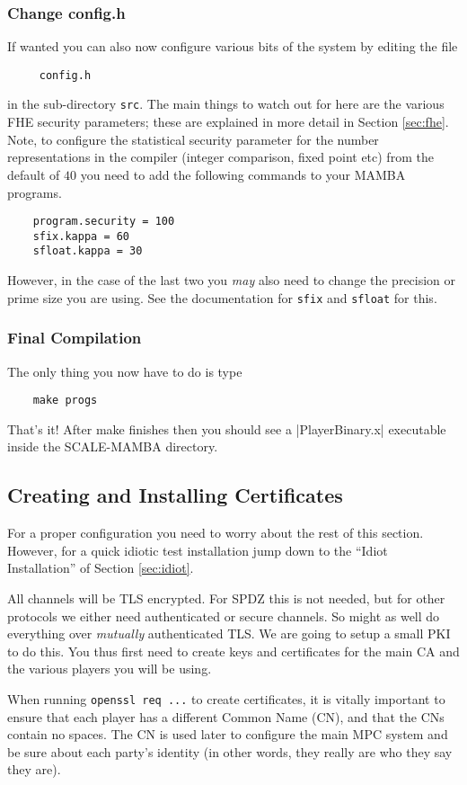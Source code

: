 \subsubsection{Change config.h}
If wanted you can also now configure various bits of the system
by editing the file
\begin{verbatim}
     config.h
\end{verbatim}
in the sub-directory \verb+src+.
The main things to watch out for here are the various FHE security parameters;
these are explained in more detail in Section \ref{sec:fhe}.
Note, to configure the statistical security parameter for the number representations
in the compiler (integer comparison, fixed point etc) from the default
of $40$ you need to add the following commands to your MAMBA programs.
\begin{verbatim}
    program.security = 100
    sfix.kappa = 60
    sfloat.kappa = 30
\end{verbatim}
However, in the case of the last two you {\em may} also need to change the
precision or prime size you are using. See the documentation for
\verb+sfix+ and \verb+sfloat+ for this.

\subsubsection{Final Compilation}
The only thing you now have to do is type
\begin{verbatim}
    make progs
\end{verbatim}
That's it! After make finishes then you should see a |PlayerBinary.x|
executable inside the SCALE-MAMBA directory.

\subsection{Creating and Installing Certificates}
\label{sec:certs}
For a proper configuration you need to worry about the rest
of this section.
However, for a quick idiotic test installation jump down to the ``Idiot
Installation'' of Section \ref{sec:idiot}.

All channels will be TLS encrypted. For SPDZ this is not needed, but for
other protocols we either need authenticated or secure channels. So might
as well do everything over {\em mutually} authenticated TLS. We are going
to setup a small PKI to do this. You thus first need to create
keys and certificates for the main CA and the various players you
will be using.

When running \verb+openssl req ...+ to create certificates, it is
vitally important to ensure that each player has a different Common
Name (CN), and that the CNs contain no spaces.  The CN is used later
to configure the main MPC system and be sure about each party's
identity (in other words, they really are who they say they are).

